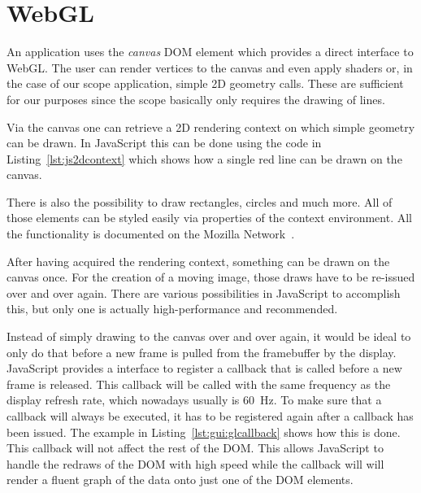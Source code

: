 \section{WebGL} %
\label{sec:app:gui:webgl}

An  application uses  the \emph{canvas}  DOM element  which provides  a direct
interface to WebGL. The user can render  vertices to the canvas and even apply
shaders  or,  in  the  case  of our  scope  application,  simple  2D  geometry
calls. These are  sufficient for our  purposes since the scope  basically only
requires the drawing of lines.

Via  the canvas  one  can retrieve  a  2D rendering  context  on which  simple
geometry can  be drawn.   In JavaScript  this can  be done  using the  code in
Listing~\ref{lst:js2dcontext} which shows  how a single red line  can be drawn
on the canvas.


There  is  also   the  possibility  to  draw  rectangles,   circles  and  much
more. All  of those  elements  can  be styled  easily  via  properties of  the
context  environment. All  the  functionality  is documented  on  the  Mozilla
Network~\cite{moz:2dcontext}.

After having  acquired the rendering  context, something  can be drawn  on the
canvas once.   For the  creation of  a moving  image, those  draws have  to be
re-issued over and  over again. There are various  possibilities in JavaScript
to accomplish this, but only one is actually high-performance and recommended.

Instead of simply drawing to the canvas over and over again, it would be ideal
to only  do that  before a  new frame is  pulled from  the framebuffer  by the
display. JavaScript provides a interface to register a callback that is called
before  a  new frame  is  released. This  callback  will  be called  with  the
same  frequency  as  the  display  refresh rate,  which  nowadays  usually  is
\SI{60}{\hertz}.  To make sure that a callback will always be executed, it has
to  be registered  again  after a  callback has  been  issued. The example  in
Listing~\ref{lst:gui:glcallback} shows  how this is done.   This callback will
not affect the  rest of the DOM. This allows JavaScript  to handle the redraws
of the DOM with high speed while  the callback will will render a fluent graph
of the data onto just one of the DOM elements.

